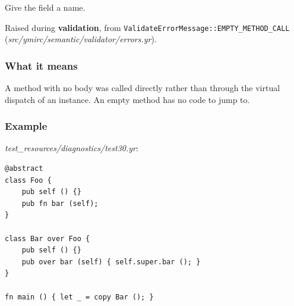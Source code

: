Give the field a name.

\label{sec:codes:e4051}

Raised during \textbf{validation}, from \texttt{ValidateErrorMessage::\allowbreak{}EMPTY\_\allowbreak{}METHOD\_\allowbreak{}CALL} (\textit{src/\allowbreak{}ymirc/\allowbreak{}semantic/\allowbreak{}validator/\allowbreak{}errors.yr}).

\subsubsection*{What it means}

A method with no body was called directly rather than through the virtual dispatch of an instance. An empty method has no code to jump to.

\subsubsection*{Example}

\textit{test\_\allowbreak{}resources/\allowbreak{}diagnostics/\allowbreak{}test30.yr}:

\begin{lstlisting}[style=coloredverbatimError]
@abstract
class Foo {
    pub self () {}
    pub fn bar (self);
}

class Bar over Foo {
    pub self () {}
    pub over bar (self) { self.super.bar (); }
}

fn main () { let _ = copy Bar (); }
\end{lstlisting}

